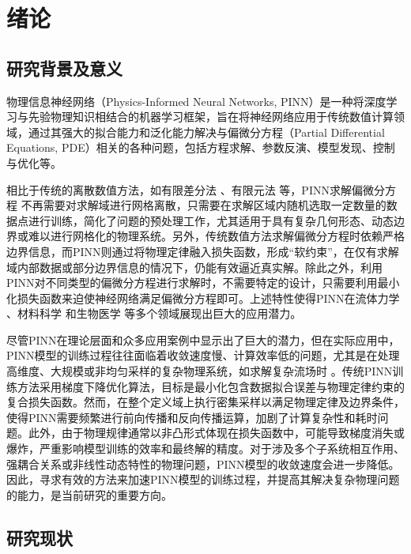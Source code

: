 \chapter{绪论}

\section{研究背景及意义}

物理信息神经网络（Physics-Informed Neural Networks, PINN）是一种将深度学习与先验物理知识相结合的机器学习框架，旨在将神经网络应用于传统数值计算领域，通过其强大的拟合能力和泛化能力解决与偏微分方程（Partial Differential Equations, PDE）相关的各种问题，包括方程求解、参数反演、模型发现、控制与优化等。

相比于传统的离散数值方法，如有限差分法 \cite{grossmann2007numerical}、有限元法 \cite{bathe2006finite}等，PINN求解偏微分方程 \cite{raissi2019physics}不再需要对求解域进行网格离散，只需要在求解区域内随机选取一定数量的数据点进行训练，简化了问题的预处理工作，尤其适用于具有复杂几何形态、动态边界或难以进行网格化的物理系统。另外，传统数值方法求解偏微分方程时依赖严格边界信息，而PINN则通过将物理定律融入损失函数，形成“软约束”，在仅有求解域内部数据或部分边界信息的情况下，仍能有效逼近真实解。除此之外，利用PINN对不同类型的偏微分方程进行求解时，不需要特定的设计，只需要利用最小化损失函数来迫使神经网络满足偏微分方程即可。上述特性使得PINN在流体力学 \cite{KQDX202308007,jin2021nsfnets}、材料科学 \cite{JSJG202304012,YDSG202305007,fang2019deep}和生物医学 \cite{LXXB202305014,kissas2020machine}等多个领域展现出巨大的应用潜力。

尽管PINN在理论层面和众多应用案例中显示出了巨大的潜力，但在实际应用中，PINN模型的训练过程往往面临着收敛速度慢、计算效率低的问题，尤其是在处理高维度、大规模或非均匀采样的复杂物理系统，如求解复杂流场时 \cite{wang2022and,fuks2020limitations}。传统PINN训练方法采用梯度下降优化算法，目标是最小化包含数据拟合误差与物理定律约束的复合损失函数。然而，在整个定义域上执行密集采样以满足物理定律及边界条件，使得PINN需要频繁进行前向传播和反向传播运算，加剧了计算复杂性和耗时问题。此外，由于物理规律通常以非凸形式体现在损失函数中，可能导致梯度消失或爆炸，严重影响模型训练的效率和最终解的精度。对于涉及多个子系统相互作用、强耦合关系或非线性动态特性的物理问题，PINN模型的收敛速度会进一步降低。因此，寻求有效的方法来加速PINN模型的训练过程，并提高其解决复杂物理问题的能力，是当前研究的重要方向。

\section{研究现状}

